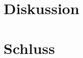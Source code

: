 \documentclass[a4paper,12pt,fleqn]{scrbook}
\begin{document}
\chapter{Diskussion}
\lipsum[1]

%
\chapter{Schluss}
\lipsum[1]

%


\newpage

\nocite{*} %


\end{document}
